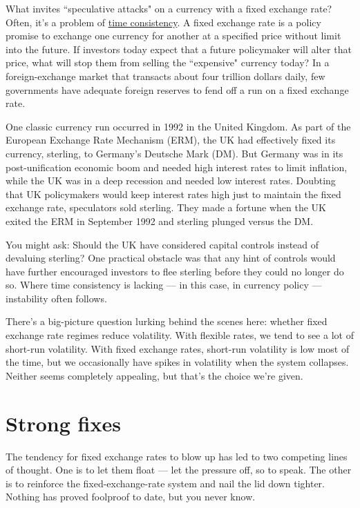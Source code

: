 What invites ``speculative attacks" on a currency with a fixed exchange
rate? Often, it's a problem of \hyperref[sec:time_cons]{time consistency}. A fixed exchange rate is a
policy promise to exchange one currency for another at a specified price
without limit into the future. If investors today expect that a future
policymaker will alter that price, what will stop them from selling the
``expensive" currency today? In a foreign-exchange market that transacts
about four trillion dollars daily, few governments have adequate foreign
reserves to fend off a run on a fixed exchange rate.

One classic currency run occurred in 1992 in the United Kingdom.
As part of the European Exchange Rate Mechanism (ERM), the UK had effectively
fixed its currency, sterling, to Germany's Deutsche Mark (DM).
But Germany was in its post-unification economic boom and needed
high interest rates to limit inflation, while the UK was in a deep recession
and needed low interest rates. Doubting that UK policymakers
would keep interest rates high just to maintain the fixed exchange rate,
speculators sold sterling. They made a fortune when the UK exited
the ERM in September 1992 and sterling plunged versus the DM.

You might ask: Should the UK have considered capital controls   instead of
devaluing sterling? One practical obstacle was that any hint of controls
would have further encouraged investors to flee sterling
before they could no longer do so. Where time consistency is lacking --- in this case, in currency policy --- instability often follows.

There's a big-picture question lurking behind the scenes here:
whether fixed exchange rate regimes reduce volatility.
With flexible rates, we tend to see a lot of short-run volatility.
With fixed exchange rates, short-run volatility is low most of the time,
but we occasionally have spikes in volatility when the system collapses.
Neither seems completely appealing, but that's the choice we're given.


\section{Strong fixes}

The tendency for fixed exchange rates to blow up has led to two
competing lines of thought.
One is to let them float --- let the pressure off, so to speak.
The other is to reinforce the fixed-exchange-rate system and nail the lid down tighter.
Nothing has proved foolproof to date, but you never know.

